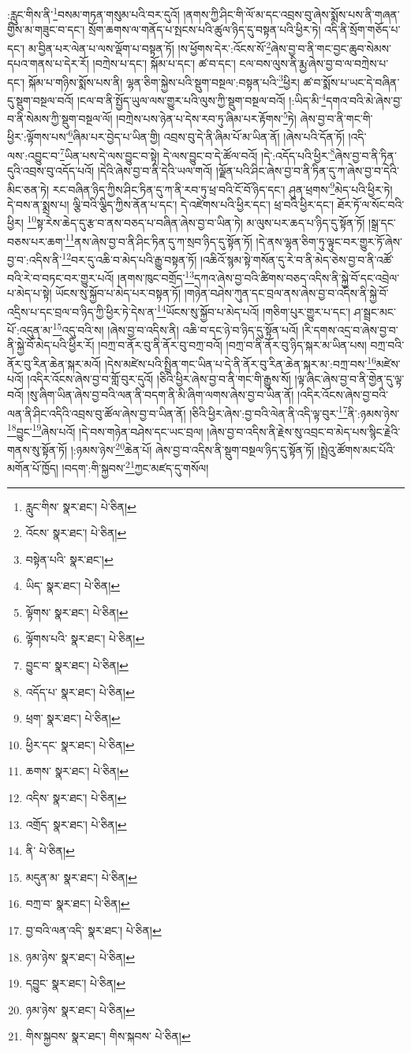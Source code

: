 :རླུང་གིས་ནི་\footnote{རླུང་གིས་  སྣར་ཐང་།  པེ་ཅིན། }བསམ་གཏན་གསུམ་པའི་བར་དུའོ། །ནགས་ཀྱི་ཤིང་གི་ལོ་མ་དང་འབྲས་བུ་ཞེས་སྨོས་པས་ནི་གཞན་གྱིས་མ་གཟུང་བ་དང་། སྲོག་ཆགས་ལ་གནོད་པ་སྤངས་པའི་ཚུལ་ཉིད་དུ་བསྟན་པའི་ཕྱིར་ཏེ། འདི་ནི་སྲོག་གཅོད་པ་དང་། མ་བྱིན་པར་ལེན་པ་ལས་ལྡོག་པ་བསྟན་ཏོ། །ས་ཕྱོགས་དེར་:འོངས་སོ་\footnote{འོངས་  སྣར་ཐང་།  པེ་ཅིན། }ཞེས་བྱ་བ་ནི་གང་བྱང་ཆུབ་སེམས་དཔའ་གནས་པ་དེར་རོ། །བཀྲེས་པ་དང་། སྐོམ་པ་དང་། ཚ་བ་དང་། ངལ་བས་ལུས་ནི་རྨྱ་ཞེས་བྱ་བ་ལ་བཀྲེས་པ་དང་། སྐོམ་པ་གཉིས་སྨོས་པས་ནི། ལྷན་ཅིག་སྐྱེས་པའི་སྡུག་བསྔལ་:བསྟན་པའི་\footnote{བསྟེན་པའི་  སྣར་ཐང་། }ཕྱིར། ཚ་བ་སྨོས་པ་ཡང་དེ་བཞིན་དུ་སྡུག་བསྔལ་བའོ། །ངལ་བ་ནི་སྤྱོད་ཡུལ་ལས་གྱུར་པའི་ལུས་ཀྱི་སྡུག་བསྔལ་བའོ། །:ཡིད་མི་\footnote{ཡིད་  སྣར་ཐང་།  པེ་ཅིན། }དགའ་བའི་མེ་ཞེས་བྱ་བ་ནི་སེམས་ཀྱི་སྡུག་བསྔལ་ལོ། །བཀྲེས་པས་ཉེན་པ་དེས་རབ་ཏུ་ཞིམ་པར་རྟོགས་\footnote{ལྟོགས་  སྣར་ཐང་།  པེ་ཅིན། }ཏེ། ཞེས་བྱ་བ་ནི་གང་གི་ཕྱིར་:ལྟོགས་པས་\footnote{ལྟོགས་པའི་  སྣར་ཐང་།  པེ་ཅིན། }ཞིམ་པར་བྱེད་པ་ཡིན་གྱི། འབྲས་བུ་དེ་ནི་ཞིམ་པོ་མ་ཡིན་ནོ། །ཞེས་པའི་དོན་ཏོ། །འདི་ལས་:འབྱུང་བ་\footnote{བྱུང་བ་  སྣར་ཐང་།  པེ་ཅིན། }ཡིན་པས་དེ་ལས་བྱུང་བ་སྟེ། དེ་ལས་བྱུང་བ་དེ་ཚོལ་བའོ། །དེ་:འདོད་པའི་ཕྱིར་\footnote{འདོད་པ་  སྣར་ཐང་།  པེ་ཅིན། }ཞེས་བྱ་བ་ནི་ཏིན་དུའི་འབྲས་བུ་འདོད་པའོ། །དེའི་ཞེས་བྱ་བ་ནི་དེའི་ཡལ་གའོ། །ལྗོན་པའི་ཤིང་ཞེས་བྱ་བ་ནི་ཏིན་དུ་ཀ་ཞེས་བྱ་བ་དེའི་མིང་ཅན་ཏེ། རང་བཞིན་ཉིད་ཀྱིས་ཤིང་ཏིན་དུ་ཀ་ནི་རབ་ཏུ་ཕྲ་བའི་ངོ་བོ་ཉིད་དང་། ཤུན་ཕྲགས་\footnote{ཕྲག་  སྣར་ཐང་།  པེ་ཅིན། }མེད་པའི་ཕྱིར་ཏེ། དེ་བས་ན་སྨྲས་པ། ལྕི་བའི་ལྕིད་ཀྱིས་ནོན་པ་དང་། དེ་འཛེགས་པའི་ཕྱིར་དང་། ཕྲ་བའི་ཕྱིར་དང་། ཐོར་ཏོ་ལ་སོང་བའི་ཕྱིར། \footnote{ཕྱིར་དང་  སྣར་ཐང་།  པེ་ཅིན། }སྟ་རེས་ཆེད་དུ་རྩ་བ་ནས་བཅད་པ་བཞིན་ཞེས་བྱ་བ་ཡིན་ཏེ། མ་ལུས་པར་ཆད་པ་ཉིད་དུ་སྟོན་ཏོ། །སྒྲ་དང་བཅས་པར་ཆག་\footnote{ཆགས་  སྣར་ཐང་།  པེ་ཅིན། }ནས་ཞེས་བྱ་བ་ནི་ཤིང་ཏིན་དུ་ཀ་སྲབ་ཉིད་དུ་སྟོན་ཏོ། །དེ་ནས་ལྷན་ཅིག་ཏུ་ལྟུང་བར་གྱུར་ཏོ་ཞེས་བྱ་བ་:འདིས་ནི་\footnote{འདིས་  སྣར་ཐང་།  པེ་ཅིན། }བར་དུ་འཆི་བ་མེད་པའི་རྒྱུ་བསྟན་ཏོ། །འཆིའོ་སྙམ་སྟེ་གསོན་དུ་རེ་བ་ནི་མེད་ཅེས་བྱ་བ་ནི་འཚོ་བའི་རེ་བ་བཏང་བར་གྱུར་པའོ། །ནགས་ཁུང་བགྲོད་\footnote{འགྲོད་  སྣར་ཐང་།  པེ་ཅིན། }དཀའ་ཞེས་བྱ་བའི་ཚིགས་བཅད་འདིས་ནི་སྐྱེ་བོ་དང་འབྲེལ་པ་མེད་པ་སྟེ། ཡོངས་སུ་སྐྱོབ་པ་མེད་པར་བསྟན་ཏོ། །གཉེན་བཤེས་ཀུན་དང་བྲལ་ནས་ཞེས་བྱ་བ་འདིས་ནི་སྐྱེ་བོ་འདྲིས་པ་དང་བྲལ་བ་ཉིད་ཀྱི་ཕྱིར་ཏེ་དེས་ན་\footnote{ནི་  པེ་ཅིན། }ཡོངས་སུ་སྐྱོབ་པ་མེད་པའོ། །གཅིག་པུར་གྱུར་པ་དང་། ཤ་སྦྲང་མང་པོ་:འདུན་མ་\footnote{མདུན་མ་  སྣར་ཐང་།  པེ་ཅིན། }འདུ་བའི་ས། །ཞེས་བྱ་བ་འདིས་ནི། འཆི་བ་དང་ཉེ་བ་ཉིད་དུ་སྟོན་པའོ། །རི་དགས་འདྲ་བ་ཞེས་བྱ་བ་ནི་སྐྱེ་བོ་མེད་པའི་ཕྱིར་རོ། །བཀྲ་བ་ནོར་བུ་ནི་ནོར་བུ་བཀྲ་བའོ། །བཀྲ་བ་ནི་ནོར་བུ་ཉིད་སྐར་མ་ཡིན་པས། བཀྲ་བའི་ནོར་བུ་རིན་ཆེན་སྐར་མའོ། །དེས་མཛེས་པའི་སྤྲིན་གང་ཡིན་པ་དེ་ནི་ནོར་བུ་རིན་ཆེན་སྐར་མ་:བཀྲ་བས་\footnote{བཀྲ་བ་  སྣར་ཐང་།  པེ་ཅིན། }མཛེས་པའོ། །འདིར་འོངས་ཞེས་བྱ་བ་གློ་བུར་དུའོ། །ཅིའི་ཕྱིར་ཞེས་བྱ་བ་ནི་གང་གི་རྒྱུས་སོ། །ལྟ་ཞིང་ཞེས་བྱ་བ་ནི་གྱེན་དུ་ལྟ་བའོ། །སུ་ཞིག་ཡིན་ཞེས་བྱ་བའི་ལན་ནི་བདག་ནི་མི་ཞིག་ལགས་ཞེས་བྱ་བ་ཡིན་ནོ། །འདིར་འོངས་ཞེས་བྱ་བའི་ལན་ནི་ཤིང་འདིའི་འབྲས་བུ་ཚོལ་ཞེས་བྱ་བ་ཡིན་ནོ། །ཅིའི་ཕྱིར་ཞེས་:བྱ་བའི་ལེན་ནི་འདི་ལྟ་བུར་\footnote{བྱ་བའི་ལན་འདི་  སྣར་ཐང་།  པེ་ཅིན། }ནི་:ཉམས་ཉེས་\footnote{ཉམ་ཉེས་  སྣར་ཐང་།  པེ་ཅིན། }བྱུང་\footnote{དབྱུང་  སྣར་ཐང་།  པེ་ཅིན། }ཞེས་པའོ། །དེ་བས་གཉེན་བཤེས་དང་ཡང་བྲལ། །ཞེས་བྱ་བ་འདིས་ནི་རྗེས་སུ་འབྲང་བ་མེད་པས་སྙིང་རྗེའི་གནས་སུ་སྟོན་ཏོ། །:ཉམས་ཉེས་\footnote{ཉམ་ཉེས་  སྣར་ཐང་།  པེ་ཅིན། }ཆེན་པོ། ཞེས་བྱ་བ་འདིས་ནི་སྡུག་བསྔལ་ཉིད་དུ་སྟོན་ཏོ། །སྤྲེའུ་ཚོགས་མང་པོའི་མགོན་པོ་ཁྱོད། །བདག་:གི་སྐྱབས་\footnote{གིས་སྐྱབས་  སྣར་ཐང་། གིས་སྐབས་  པེ་ཅིན། }ཀྱང་མཛད་དུ་གསོལ། 